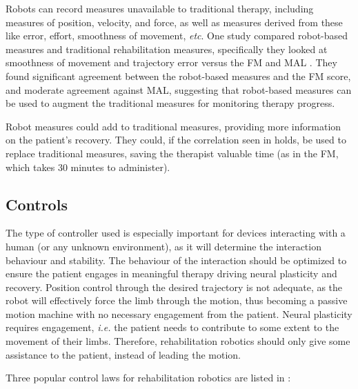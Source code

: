 \documentclass[12pt]{report}
\begin{document}
Robots can record measures unavailable to traditional therapy, including measures of position, velocity, and force, as well as measures derived from these like error, effort, smoothness of movement, \textit{etc}. One study compared robot-based measures and traditional rehabilitation measures, specifically they looked at smoothness of movement and trajectory error versus the FM and MAL \cite{Celik2008}. They found significant agreement between the robot-based measures and the FM score, and moderate agreement against MAL, suggesting that robot-based measures can be used to augment the traditional measures for monitoring therapy progress. 

Robot measures could add to traditional measures, providing more information on the patient's recovery. They could, if the correlation seen in \cite{Celik2008} holds, be used to replace traditional measures, saving the therapist valuable time (as in the FM, which takes 30 minutes to administer). 

	
	\subsection{Controls} 
	
	The type of controller used is especially important for devices interacting with a human (or any unknown environment), as it will determine the interaction behaviour and stability. The behaviour of the interaction should be optimized to ensure the patient engages in meaningful therapy driving neural plasticity and recovery. Position control through the desired trajectory is not adequate, as the robot will effectively force the limb through the motion, thus becoming a passive motion machine with no necessary engagement from the patient. Neural plasticity requires engagement, \textit{i.e.} the patient needs to contribute to some extent to the movement of their limbs. Therefore, rehabilitation robotics should only give some assistance to the patient, instead of leading the motion. 
	
	Three popular control laws for rehabilitation robotics are listed in \cite{Meng2015}:
	
\end{document}
